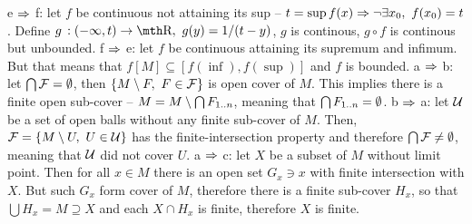 \smallskip
e $\Rightarrow$ f: let $f$ be continuous not attaining its sup -- $t=\sup f(x) 
\Rightarrow \neg \exists x_0,\ f(x_0) = t$. Define $g\,:(-\infty,t)\to \R,\ 
g(y)=1/(t-y)$, $g$ is continous, $g\circ f$ is continous but unbounded.
\smallskip
f $\Rightarrow$ e: let $f$ be continuous attaining its supremum and infimum. 
But that means that $f[M] \subseteq [f(\inf),f(\sup)]$ and $f$ is bounded.
\smallskip
a $\Rightarrow$ b: let $\bigcap {\cal F} = \emptyset$, then $\{M\setminus F,\ F\in {\cal F}\}$ 
is open cover of $M$. This implies there is a finite open sub-cover -- 
$M = M \setminus \bigcap F_{1..n}$, meaning that $\bigcap F_{1..n} = \emptyset$.
\smallskip
b $\Rightarrow$ a: let $\cal U$ be a set of open balls without any finite sub-cover
of $M$. Then, ${\cal F} = \{M\setminus U,\ U\in{\cal U}\}$ has the 
finite-intersection property and therefore $\bigcap \cal F \neq \emptyset$, meaning 
that $\cal U$ did not cover $U$.
\smallskip
a $\Rightarrow$ c: let $X$ be a subset of $M$ without limit point. Then for all 
$x\in M$ there is an open set $G_x\ni x$ with finite intersection with $X$.
But such $G_x$ form cover of $M$, therefore there is a finite sub-cover 
$H_x$, so that $\bigcup H_x = M \supseteq X$ and each $X\cap H_x$ is finite, 
therefore $X$ is finite.
